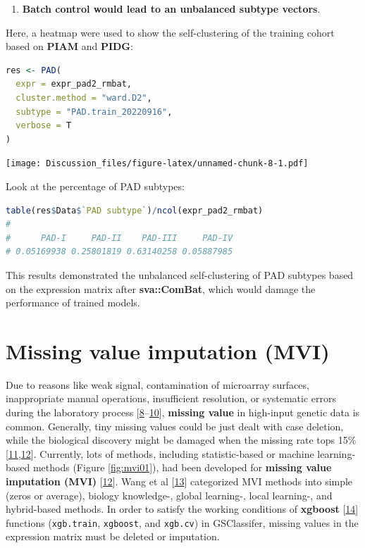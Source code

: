 \documentclass[
  12pt,
]{book}
\newcommand{\passthrough}[1]{#1}
\providecommand{\tightlist}{%
  \setlength{\itemsep}{0pt}\setlength{\parskip}{0pt}}
\begin{document}
\begin{enumerate}
\def\labelenumi{\arabic{enumi}.}
\setcounter{enumi}{1}
\tightlist
\item
  \textbf{Batch control would lead to an unbalanced subtype vectors}.
\end{enumerate}

Here, a heatmap were used to show the self-clustering of the training cohort based on \textbf{PIAM} and \textbf{PIDG}:

\begin{lstlisting}[language=R]
res <- PAD(
  expr = expr_pad2_rmbat,
  cluster.method = "ward.D2",
  subtype = "PAD.train_20220916",
  verbose = T
)
\end{lstlisting}

\texttt{[image: Discussion\_files/figure-latex/unnamed-chunk-8-1.pdf]}

Look at the percentage of PAD subtypes:

\begin{lstlisting}[language=R]
table(res$Data$`PAD subtype`)/ncol(expr_pad2_rmbat)
# 
#      PAD-I     PAD-II    PAD-III     PAD-IV 
# 0.05169938 0.25801819 0.63140258 0.05887985
\end{lstlisting}

This results demonstrated the unbalanced self-clustering of PAD subtypes based on the expression matrix after \textbf{sva::ComBat}, which would damage the performance of trained models.

\hypertarget{missing-value-imputation-mvi}{%
\section{Missing value imputation (MVI)}\label{missing-value-imputation-mvi}}

Due to reasons like weak signal, contamination of microarray surfaces, inappropriate manual operations, insufficient resolution, or systematic errors during the laboratory process {[}\protect\hyperlink{ref-RN387}{8}--\protect\hyperlink{ref-RN382}{10}{]}, \textbf{missing value} in high-input genetic data is common. Generally, tiny missing values could be just dealt with case deletion, while the biological discovery might be damaged when the missing rate tops 15\% {[}\protect\hyperlink{ref-RN392}{11},\protect\hyperlink{ref-RN386}{12}{]}. Currently, lots of methods, including statistic-based or machine learning-based methods (Figure \ref{fig:mvi01}), had been developed for \textbf{missing value imputation (MVI)} {[}\protect\hyperlink{ref-RN386}{12}{]}. Wang et al {[}\protect\hyperlink{ref-RN384}{13}{]} categorized MVI methods into simple (zeros or average), biology knowledge-, global learning-, local learning-, and hybrid-based methods. In order to satisfy the working conditions of \textbf{xgboost} {[}\protect\hyperlink{ref-xgboost}{14}{]} functions (\passthrough{\lstinline!xgb.train!}, \passthrough{\lstinline!xgboost!}, and \passthrough{\lstinline!xgb.cv!}) in GSClassifer, missing values in the expression matrix must be deleted or imputation.
\end{document}
